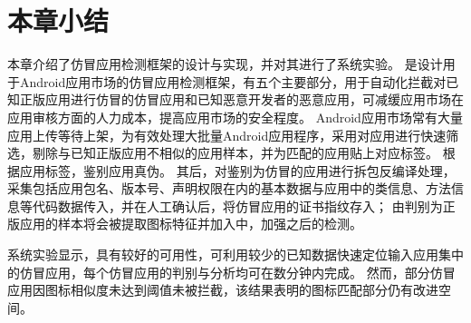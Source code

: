

\section{本章小结}

本章介绍了仿冒应用检测框架\mytool 的设计与实现，并对其进行了系统实验。
\mytool 是设计用于Android应用市场的仿冒应用检测框架，有五个主要部分，用于自动化拦截对已知正版应用进行仿冒的仿冒应用和已知恶意开发者的恶意应用，可减缓应用市场在应用审核方面的人力成本，提高应用市场的安全程度。
Android应用市场常有大量应用上传等待上架，为有效处理大批量Android应用程序，\mytool 采用\componentA 对应用进行快速筛选，剔除与已知正版应用不相似的应用样本，并为匹配的应用贴上对应标签。
\componentB 根据应用标签，鉴别应用真伪。
其后，\componentC 对\componentB 鉴别为仿冒的应用进行拆包反编译处理，采集包括应用包名、版本号、声明权限在内的基本数据与应用中的类信息、方法信息等代码数据传入\componentD ，并在人工确认后，将仿冒应用的证书指纹存入\componentE ；
由\componentB 判别为正版应用的样本将会被提取图标特征并加入\componentE 中，加强之后的检测。

系统实验显示，\mytool 具有较好的可用性，可利用较少的已知数据快速定位输入应用集中的仿冒应用，每个仿冒应用的判别与分析均可在数分钟内完成。
然而，部分仿冒应用因图标相似度未达到阈值未被\mytool 拦截，该结果表明\mytool 的图标匹配部分仍有改进空间。
